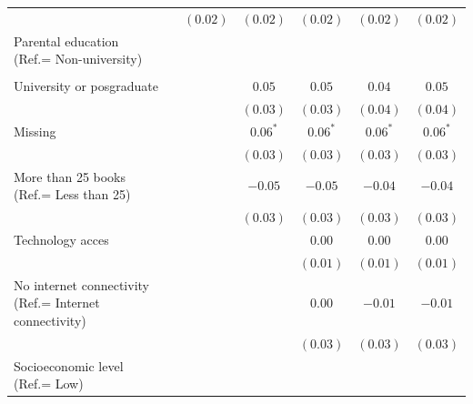 \documentclass[
  12pt,
  letterpaper,
]{article}
\begin{document}
\begin{table}
{\begin{center}
{\begin{threeparttable}
\begin{tabular}{l c c c c c c}
                                                       &              & $(0.02)$      & $(0.02)$      & $(0.02)$      & $(0.02)$      & $(0.02)$      \\
Parental education (Ref.= Non-university)              &              &               &               &               &               &               \\
                                                       &              &               &               &               &               &               \\
\quad University or posgraduate                        &              &               & $0.05$        & $0.05$        & $0.04$        & $0.05$        \\
                                                       &              &               & $(0.03)$      & $(0.03)$      & $(0.04)$      & $(0.04)$      \\
\quad Missing                                          &              &               & $0.06^{*}$    & $0.06^{*}$    & $0.06^{*}$    & $0.06^{*}$    \\
                                                       &              &               & $(0.03)$      & $(0.03)$      & $(0.03)$      & $(0.03)$      \\
More than 25 books (Ref.= Less than 25)                &              &               & $-0.05$       & $-0.05$       & $-0.04$       & $-0.04$       \\
                                                       &              &               & $(0.03)$      & $(0.03)$      & $(0.03)$      & $(0.03)$      \\
Technology acces                                       &              &               &               & $0.00$        & $0.00$        & $0.00$        \\
                                                       &              &               &               & $(0.01)$      & $(0.01)$      & $(0.01)$      \\
No internet connectivity (Ref.= Internet connectivity) &              &               &               & $0.00$        & $-0.01$       & $-0.01$       \\
                                                       &              &               &               & $(0.03)$      & $(0.03)$      & $(0.03)$      \\
Socioeconomic level (Ref.= Low)                        &              &               &               &               &               &               \\

\end{tabular}
\end{threeparttable}}
\end{center}}
\end{table}
\end{document}
